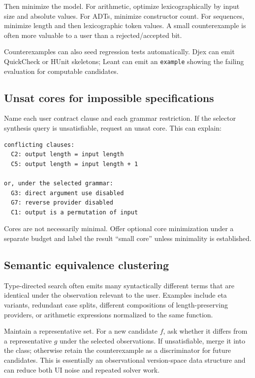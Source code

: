 \documentclass[11pt,oneside]{article}
\newcommand{\code}[1]{\texttt{#1}}
\begin{document}
Then minimize the model. For arithmetic, optimize lexicographically by input size and
absolute values. For ADTs, minimize constructor count. For sequences, minimize length
and then lexicographic token values. A small counterexample is often more valuable to a
user than a rejected/accepted bit.

Counterexamples can also seed regression tests automatically. Djex can emit QuickCheck
or HUnit skeletons; Leant can emit an \code{example} showing the failing evaluation for
computable candidates.

\subsection{Unsat cores for impossible specifications}

Name each user contract clause and each grammar restriction. If the selector synthesis
query is unsatisfiable, request an unsat core. This can explain:

\begin{lstlisting}
conflicting clauses:
  C2: output length = input length
  C5: output length = input length + 1

or, under the selected grammar:
  G3: direct argument use disabled
  G7: reverse provider disabled
  C1: output is a permutation of input
\end{lstlisting}

Cores are not necessarily minimal. Offer optional core minimization under a separate
budget and label the result ``small core'' unless minimality is established.

\subsection{Semantic equivalence clustering}

Type-directed search often emits many syntactically different terms that are identical
under the observation relevant to the user. Examples include eta variants, redundant
case splits, different compositions of length-preserving providers, or arithmetic
expressions normalized to the same function.

Maintain a representative set. For a new candidate $f$, ask whether it differs from a
representative $g$ under the selected observations. If unsatisfiable, merge it into the
class; otherwise retain the counterexample as a discriminator for future candidates.
This is essentially an observational version-space data structure and can reduce both
UI noise and repeated solver work.
\end{document}
